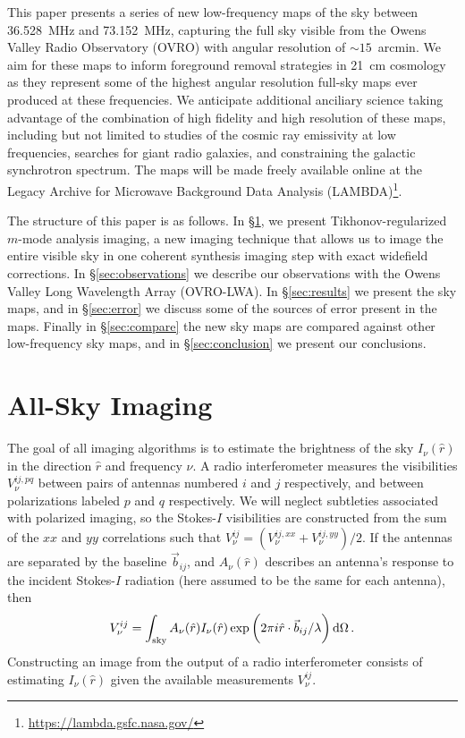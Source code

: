 \documentclass[twocolumn]{aastex61}
\renewcommand{\d}{{\rm d}}
\begin{document}
This paper presents a series of new low-frequency maps of the sky between 36.528~MHz and 73.152~MHz,
capturing the full sky visible from the Owens Valley Radio Observatory (OVRO) with angular
resolution of $\sim 15$~arcmin. We aim for these maps to inform foreground removal strategies in
21~cm cosmology as they represent some of the highest angular resolution full-sky maps ever produced
at these frequencies. We anticipate additional anciliary science taking advantage of the combination
of high fidelity and high resolution of these maps, including but not limited to studies of the
cosmic ray emissivity at low frequencies, searches for giant radio galaxies, and constraining the
galactic synchrotron spectrum. The maps will be made freely available online at the Legacy Archive
for Microwave Background Data Analysis (LAMBDA)\footnote{\url{https://lambda.gsfc.nasa.gov/}}.

The structure of this paper is as follows. In \S\ref{sec:imaging}, we present Tikhonov-regularized
$m$-mode analysis imaging, a new imaging technique that allows us to image the entire visible sky in
one coherent synthesis imaging step with exact widefield corrections. In \S\ref{sec:observations} we
describe our observations with the Owens Valley Long Wavelength Array (OVRO-LWA). In
\S\ref{sec:results} we present the sky maps, and in \S\ref{sec:error} we discuss some of the sources
of error present in the maps. Finally in \S\ref{sec:compare} the new sky maps are compared against
other low-frequency sky maps, and in \S\ref{sec:conclusion} we present our conclusions.

\section{All-Sky Imaging}\label{sec:imaging}

The goal of all imaging algorithms is to estimate the brightness of the sky $I_\nu(\hat r)$ in the
direction $\hat r$ and frequency $\nu$.  A radio interferometer measures the visibilities
$V^{ij,pq}_{\nu}$ between pairs of antennas numbered $i$ and $j$ respectively, and between
polarizations labeled $p$ and $q$ respectively. We will neglect subtleties associated with polarized
imaging, so the Stokes-$I$ visibilities are constructed from the sum of the $xx$ and $yy$
correlations such that $V^{ij}_{\nu} = (V^{ij,xx}_{\nu}+V^{ij,yy}_{\nu})/2$.  If the antennas are
separated by the baseline $\vec b_{ij}$, and $A_\nu(\hat r)$ describes an antenna's response to the
incident Stokes-$I$ radiation (here assumed to be the same for each antenna), then
\begin{equation}\label{eq:basic-imaging}
    V^{ij}_\nu = \int_\text{sky}
                 A_\nu(\hat r) I_\nu(\hat r)
                 \exp\bigg(2\pi i \hat r\cdot\vec b_{ij}/\lambda\bigg) \,\d\Omega \, .
\end{equation}
Constructing an image from the output of a radio interferometer consists of estimating $I_\nu(\hat
r)$ given the available measurements $V^{ij}_\nu$.
\end{document}
